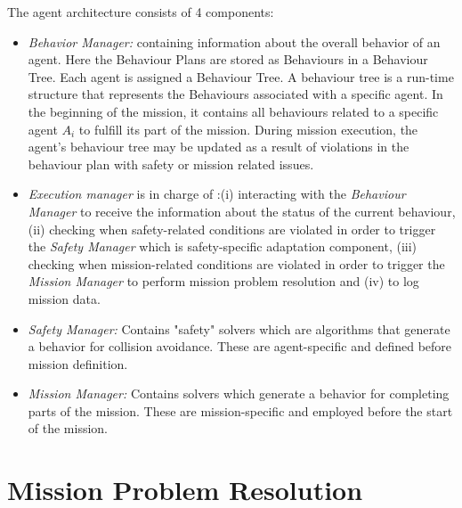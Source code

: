 \documentclass[journal]{IEEEtran}
\theoremstyle{definition}
\begin{document}
The agent architecture consists of 4 components:
\begin{itemize}
    \item \textit{Behavior Manager:} containing information about the overall behavior of an agent. Here the Behaviour Plans are stored as Behaviours in a Behaviour Tree. Each agent is assigned a Behaviour Tree. A behaviour tree is a run-time structure that represents the Behaviours associated with a specific agent. In the beginning of the mission, it contains all behaviours related to a specific agent $A_i$ to fulfill its part of the mission. During mission execution, the agent's behaviour tree may be updated as a result of violations in the behaviour plan with safety or mission related issues.
    \item \textit{Execution manager} is in charge of :(i) interacting with the \textit{Behaviour Manager} to receive the information about the status of the current behaviour, (ii) checking when safety-related conditions are violated in order to trigger the \textit{Safety Manager} which is safety-specific adaptation component, (iii) checking when mission-related conditions are violated in order to trigger the \textit{Mission Manager} to perform mission problem resolution and (iv) to log mission data.
    \item \textit{Safety Manager:} Contains "safety" solvers which are algorithms that generate a behavior for collision avoidance. These are agent-specific and defined before mission definition.
    \item \textit{Mission Manager:} Contains solvers which generate a behavior for completing parts of the mission. These are mission-specific and employed  before the start of the mission.  
\end{itemize}






\section{Mission Problem Resolution}

 
\end{document}
